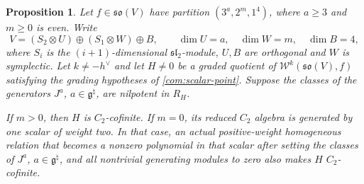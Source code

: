 \documentclass[11pt,a4paper]{amsart}
\numberwithin{equation}{section}
\newtheorem{proposition}[theorem]{Proposition}
\theoremstyle{definition}
\theoremstyle{remark}
\newcommand{\g}{\mathfrak g}
\newcommand{\sog}{\mathfrak{so}}
\newcommand{\slg}{\mathfrak{sl}}
\begin{document}
\begin{proposition}\label{com:orthogonal-point}
Let $f\in\sog(V)$ have partition $(3^a,2^m,1^4)$, where $a\ge3$
and $m\ge0$ is even. Write
$$
 V=(S_2\otimes U)\oplus(S_1\otimes W)\oplus B,
 \qquad \dim U=a,\quad\dim W=m,\quad\dim B=4,
$$
where $S_i$ is the $(i+1)$-dimensional $\slg_2$-module,
$U,B$ are orthogonal and $W$ is symplectic.
Let $k\ne-h^\vee$ and let $H\ne0$ be a graded quotient of
$\mathcal W^k(\sog(V),f)$ satisfying the grading hypotheses of
\cref{com:scalar-point}. Suppose the classes of the generators $J^a$, $a\in\g^\natural$,
are nilpotent in $R_H$.

If $m>0$, then $H$ is $C_2$-cofinite. If $m=0$, its reduced
$C_2$ algebra is generated by one scalar of weight two. In that case,
an actual positive-weight homogeneous relation that becomes a nonzero
polynomial in that scalar after setting the classes of $J^a$, $a\in\g^\natural$, and all
nontrivial generating modules to zero also makes
$H$ $C_2$-cofinite.
\end{proposition}
\end{document}
